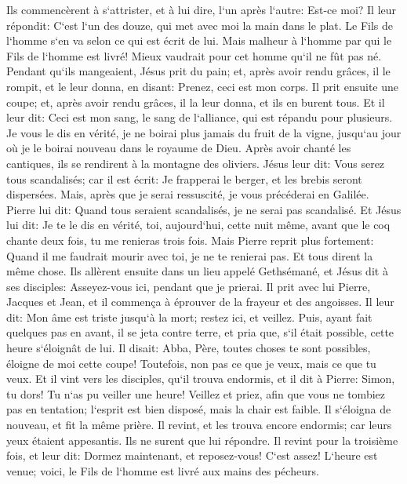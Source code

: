 \verse Ils commencèrent à s`attrister, et à lui dire, l`un après l`autre: Est-ce moi? 
\verse Il leur répondit: C`est l`un des douze, qui met avec moi la main dans le plat. 
\verse Le Fils de l`homme s`en va selon ce qui est écrit de lui. Mais malheur à l`homme par qui le Fils de l`homme est livré! Mieux vaudrait pour cet homme qu`il ne fût pas né. 
\verse Pendant qu`ils mangeaient, Jésus prit du pain; et, après avoir rendu grâces, il le rompit, et le leur donna, en disant: Prenez, ceci est mon corps. 
\verse Il prit ensuite une coupe; et, après avoir rendu grâces, il la leur donna, et ils en burent tous. 
\verse Et il leur dit: Ceci est mon sang, le sang de l`alliance, qui est répandu pour plusieurs. 
\verse Je vous le dis en vérité, je ne boirai plus jamais du fruit de la vigne, jusqu`au jour où je le boirai nouveau dans le royaume de Dieu. 
\verse Après avoir chanté les cantiques, ils se rendirent à la montagne des oliviers. 
\verse Jésus leur dit: Vous serez tous scandalisés; car il est écrit: Je frapperai le berger, et les brebis seront dispersées. 
\verse Mais, après que je serai ressuscité, je vous précéderai en Galilée. 
\verse Pierre lui dit: Quand tous seraient scandalisés, je ne serai pas scandalisé. 
\verse Et Jésus lui dit: Je te le dis en vérité, toi, aujourd`hui, cette nuit même, avant que le coq chante deux fois, tu me renieras trois fois. 
\verse Mais Pierre reprit plus fortement: Quand il me faudrait mourir avec toi, je ne te renierai pas. Et tous dirent la même chose. 
\verse Ils allèrent ensuite dans un lieu appelé Gethsémané, et Jésus dit à ses disciples: Asseyez-vous ici, pendant que je prierai. 
\verse Il prit avec lui Pierre, Jacques et Jean, et il commença à éprouver de la frayeur et des angoisses. 
\verse Il leur dit: Mon âme est triste jusqu`à la mort; restez ici, et veillez. 
\verse Puis, ayant fait quelques pas en avant, il se jeta contre terre, et pria que, s`il était possible, cette heure s`éloignât de lui. 
\verse Il disait: Abba, Père, toutes choses te sont possibles, éloigne de moi cette coupe! Toutefois, non pas ce que je veux, mais ce que tu veux. 
\verse Et il vint vers les disciples, qu`il trouva endormis, et il dit à Pierre: Simon, tu dors! Tu n`as pu veiller une heure! 
\verse Veillez et priez, afin que vous ne tombiez pas en tentation; l`esprit est bien disposé, mais la chair est faible. 
\verse Il s`éloigna de nouveau, et fit la même prière. 
\verse Il revint, et les trouva encore endormis; car leurs yeux étaient appesantis. Ils ne surent que lui répondre. 
\verse Il revint pour la troisième fois, et leur dit: Dormez maintenant, et reposez-vous! C`est assez! L`heure est venue; voici, le Fils de l`homme est livré aux mains des pécheurs. 

